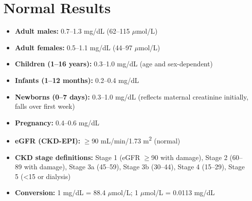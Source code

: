 \section*{Normal Results}
\begin{itemize}
  \item \textbf{Adult males:} 0.7--1.3 mg/dL (62--115 $\mu$mol/L) \cite{fischbach2023manual}
  \item \textbf{Adult females:} 0.5--1.1 mg/dL (44--97 $\mu$mol/L)
  \item \textbf{Children (1--16 years):} 0.3--1.0 mg/dL (age and sex-dependent)
  \item \textbf{Infants (1--12 months):} 0.2--0.4 mg/dL
  \item \textbf{Newborns (0--7 days):} 0.3--1.0 mg/dL (reflects maternal creatinine initially, falls over first week)
  \item \textbf{Pregnancy:} 0.4--0.6 mg/dL
  \item \textbf{eGFR (CKD-EPI):} $\geq$90 mL/min/1.73 m\textsuperscript{2} (normal)
  \item \textbf{CKD stage definitions:} Stage 1 (eGFR $\geq$90 with damage), Stage 2 (60--89 with damage), Stage 3a (45--59), Stage 3b (30--44), Stage 4 (15--29), Stage 5 (<15 or dialysis)
  \item \textbf{Conversion:} 1 mg/dL = 88.4 $\mu$mol/L; 1 $\mu$mol/L = 0.0113 mg/dL
\end{itemize}

